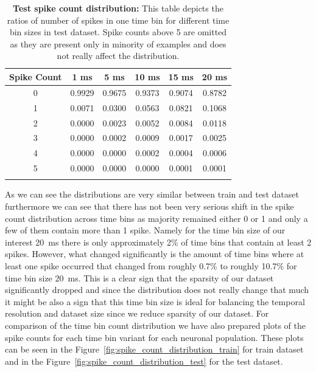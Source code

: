 \begin{table}
    \centering\footnotesize\sf
    \begin{tabular}{cccccc}
    \toprule
        Spike Count & 1 ms & 5 ms & 10 ms & 15 ms & 20 ms \\
    \midrule
        0 & 0.9929 & 0.9675 & 0.9373 & 0.9074 & 0.8782 \\
        1 & 0.0071 & 0.0300 & 0.0563 & 0.0821 & 0.1068 \\
        2 & 0.0000 & 0.0023 & 0.0052 & 0.0084 & 0.0118 \\
        3 & 0.0000 & 0.0002 & 0.0009 & 0.0017 & 0.0025 \\
        4 & 0.0000 & 0.0000 & 0.0002 & 0.0004 & 0.0006 \\
        5 & 0.0000 & 0.0000 & 0.0000 & 0.0001 & 0.0001 \\
    \addlinespace %
    \bottomrule
    \end{tabular}
    \caption{\textbf{Test spike count distribution:} This table depicts the ratios of number of spikes in one time bin for different time bin sizes in test dataset. Spike counts above 5 are omitted as they are present only in minority of examples and does not really affect the distribution.}
    \label{tab:test_bin_count_distribution}
\end{table}

As we can see the distributions are very similar between train and test dataset furthermore we can see that there has not been very serious shift in the spike count distribution across time bins as majority remained either 0 or 1 and only a few of them contain more than 1 spike. Namely for the time bin size of our interest 20~ms there is only approximately 2\% of time bins that contain at least 2 spikes. However, what changed significantly is the amount of time bins where at least one spike occurred that changed from roughly 0.7\% to roughly 10.7\% for time bin size 20~ms. This is a clear sign that the sparsity of our dataset significantly dropped and since the distribution does not really change that much it might be also a sign that this time bin size is ideal for balancing the temporal resolution and dataset size since we reduce sparsity of our dataset. For comparison of the time bin count distribution we have also prepared plots of the spike counts for each time bin variant for each neuronal population. These plots can be seen in the Figure~\ref{fig:spike_count_distribution_train} for train dataset and in the Figure~\ref{fig:spike_count_distribution_test} for the test dataset.

